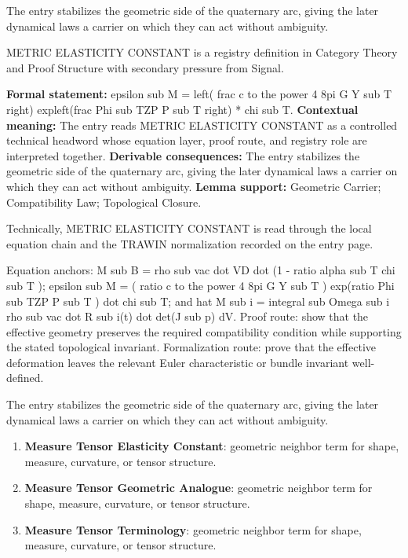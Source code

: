 The entry stabilizes the geometric side of the quaternary arc, giving the later dynamical laws a carrier on which they can act without ambiguity.
\clearpage


\begingroup\small
{}
METRIC ELASTICITY CONSTANT is a registry definition in Category Theory and Proof Structure with secondary pressure from Signal.

\begingroup\footnotesize\setlength{\emergencystretch}{3em}\sloppy
\textbf{Formal statement:} epsilon sub M = left( frac c to the power 4 8pi G Y sub T right) expleft(frac Phi sub TZP P sub T right) * chi sub T. \textbf{Contextual meaning:} The entry reads METRIC ELASTICITY CONSTANT as a controlled technical headword whose equation layer, proof route, and registry role are interpreted together. \textbf{Derivable consequences:} The entry stabilizes the geometric side of the quaternary arc, giving the later dynamical laws a carrier on which they can act without ambiguity. \textbf{Lemma support:} Geometric Carrier; Compatibility Law; Topological Closure.\par
\endgroup

Technically, METRIC ELASTICITY CONSTANT is read through the local equation chain and the TRAWIN normalization recorded on the entry page.

Equation anchors: M sub B = rho sub vac dot VD dot (1 - ratio alpha sub T chi sub T ); epsilon sub M = ( ratio c to the power 4 8pi G Y sub T ) exp(ratio Phi sub TZP P sub T ) dot chi sub T; and hat M sub i = integral sub Omega sub i rho sub vac dot R sub i(t) dot det(J sub p) dV. Proof route: show that the effective geometry preserves the required compatibility condition while supporting the stated topological invariant. Formalization route: prove that the effective deformation leaves the relevant Euler characteristic or bundle invariant well-defined.

The entry stabilizes the geometric side of the quaternary arc, giving the later dynamical laws a carrier on which they can act without ambiguity.
\endgroup

\begin{enumerate}[leftmargin=1.6em,itemsep=6pt,topsep=4pt]
\item \textbf{Measure Tensor Elasticity Constant}: geometric neighbor term for shape, measure, curvature, or tensor structure.
\item \textbf{Measure Tensor Geometric Analogue}: geometric neighbor term for shape, measure, curvature, or tensor structure.
\item \textbf{Measure Tensor Terminology}: geometric neighbor term for shape, measure, curvature, or tensor structure.
\end{enumerate}

